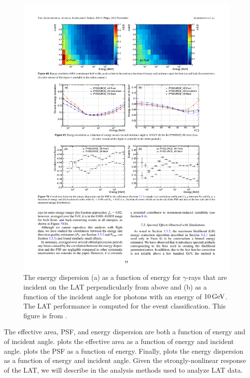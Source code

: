\begin{figure}[htbp]
  \centering
  \includegraphics{chapters/introduction/figures/lat_energy_dispersion.pdf}
  \caption{
  The energy dispersion (a) as a function of energy for $\gamma$-rays that
  are incident on the \ac{LAT} perpendicularly from above and (b) as a function
  of the incident angle for photons with an energy of $10\,\text{GeV}$.
  The \ac{LAT} performance is computed for the \psevensourcevsix
  event classification.
  This figure is from \cite{ackermann_2012a_fermi-large}.
  }
\end{figure} 

The effective area, \ac{PSF}, and energy dispersion are both a function
of energy and of incident angle.  
plots the effective area as a function of energy and incident angle.
 plots the \ac{PSF} as a function of energy.  Finally,
 plots the energy dispersion as a function
of energy and incident angle.  Given the strongly-nonlinear response of
the \ac{LAT}, we will describe in 
the analysis methods used to analyze \ac{LAT} data.
